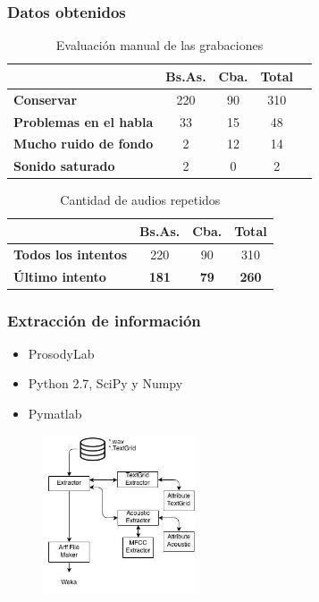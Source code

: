 \documentclass[mathserif]{beamer}%
\begin{document}
\begin{frame}
	\frametitle{Datos obtenidos}
	
	\begin{table}[h]
		\centering
		\begin{tabular}{|l|c|c|c|c|}
			\hline
			\textbf{}  & \textbf{Bs.As. } & \textbf{Cba.} & \textbf{Total} \\ \hline
			\textbf{Conservar}  & 220 & 90 & 310 \\ \hline
			\textbf{Problemas en el habla}  & 33 & 15 & 48 \\ \hline
			\textbf{Mucho ruido de fondo}  & 2 & 12 & 14 \\ \hline
			\textbf{Sonido saturado}  & 2 & 0 & 2 \\ \hline
		\end{tabular}
		\caption{Evaluación manual de las grabaciones}
		\label{eva_table}
	\end{table}
	
	\begin{table}[H]
		\centering
		\begin{tabular}{|l|c|c|c|}
			\hline
			\textbf{}  & \textbf{Bs.As. } & \textbf{Cba.} & \textbf{Total} \\ \hline
			\textbf{Todos los intentos}  & 220 & 90 & 310 \\ \hline
			\cellcolor{blue!25}\textbf{Último intento}  & \cellcolor{blue!25}\textbf{181} & \cellcolor{blue!25}\textbf{79} & \cellcolor{blue!25}\textbf{260} \\ \hline
		\end{tabular}
		\caption{Cantidad de audios repetidos}
		\label{eva_table_rep}
	\end{table}
\end{frame}

\begin{frame}
	\frametitle{Extracción de información}
	
	\begin{center}
		\begin{itemize}
			\item ProsodyLab
			\item Python 2.7, SciPy y Numpy
			\item Pymatlab 
		\end{itemize}
	\end{center}
	
	\begin{figure}[h!]
		\centerline{\includegraphics[width=0.4\textwidth]{diagrama_workflow} }
	\end{figure}
\end{frame}
\end{document}
